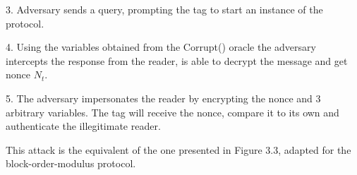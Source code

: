     3. Adversary sends a query, prompting the tag to start an instance of the protocol.

    4. Using the variables obtained from the Corrupt() oracle the adversary intercepts the response from the reader, is able to decrypt 
    the message and get nonce $N_t$. 

    5. The adversary impersonates the reader by encrypting the nonce and 3 arbitrary variables. The tag will receive the nonce, compare it
    to its own and authenticate the illegitimate reader.

    This attack is the equivalent of the one presented in Figure 3.3, adapted for the block-order-modulus protocol. 

    \begin{adjustwidth}{-30pt}{}
\end{adjustwidth}
